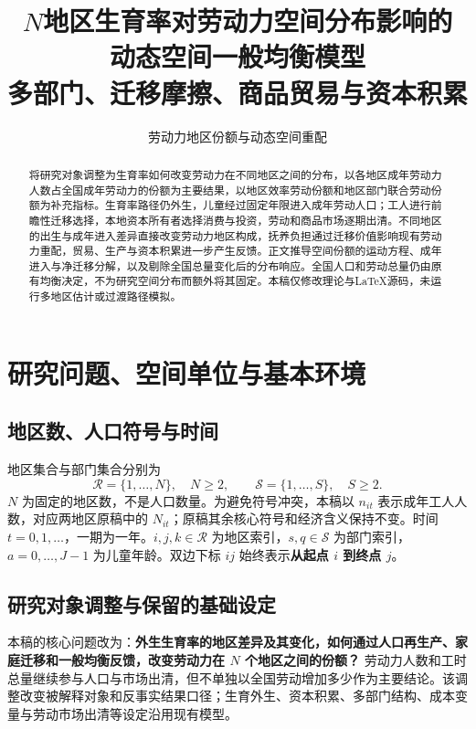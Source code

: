 \documentclass[UTF8,a4paper,zihao=-4,fontset=windows]{ctexart}
\title{$N$地区生育率对劳动力空间分布影响的\\动态空间一般均衡模型\\[0.4em]
\large 多部门、迁移摩擦、商品贸易与资本积累}
\author{劳动力地区份额与动态空间重配}
\date{}
\numberwithin{equation}{section}
\begin{document}
\maketitle
\begin{abstract}
将研究对象调整为生育率如何改变劳动力在不同地区之间的分布，以各地区成年劳动力人数占全国成年劳动力的份额为主要结果，以地区效率劳动份额和地区部门联合劳动份额为补充指标。生育率路径仍外生，儿童经过固定年限进入成年劳动人口；工人进行前瞻性迁移选择，本地资本所有者选择消费与投资，劳动和商品市场逐期出清。不同地区的出生与成年进入差异直接改变劳动力地区构成，抚养负担通过迁移价值影响现有劳动力重配，贸易、生产与资本积累进一步产生反馈。正文推导空间份额的运动方程、成年进入与净迁移分解，以及剔除全国总量变化后的分布响应。全国人口和劳动总量仍由原有均衡决定，不为研究空间分布而额外将其固定。本稿仅修改理论与LaTeX源码，未运行多地区估计或过渡路径模拟。
\end{abstract}
\newpage
\tableofcontents
\newpage

\section{研究问题、空间单位与基本环境}
\label{sec:lg-environment}

\subsection{地区数、人口符号与时间}
地区集合与部门集合分别为
\begin{equation}
 \mathcal R=\{1,\ldots,N\},\quad N\geq2,\qquad
 \mathcal S=\{1,\ldots,S\},\quad S\geq2.
 \label{eq:lg-sets}
\end{equation}
$N$ 为固定的地区数，不是人口数量。为避免符号冲突，本稿以 $n_{it}$ 表示成年工人人数，对应两地区原稿中的 $N_{it}$；原稿其余核心符号和经济含义保持不变。时间 $t=0,1,\ldots$，一期为一年。$i,j,k\in\mathcal R$ 为地区索引，$s,q\in\mathcal S$ 为部门索引，$a=0,\ldots,J-1$ 为儿童年龄。双边下标 $ij$ 始终表示\textbf{从起点 $i$ 到终点 $j$}。

\subsection{研究对象调整与保留的基础设定}
本稿的核心问题改为：\textbf{外生生育率的地区差异及其变化，如何通过人口再生产、家庭迁移和一般均衡反馈，改变劳动力在 $N$ 个地区之间的份额？} 劳动力人数和工时总量继续参与人口与市场出清，但不单独以全国劳动增加多少作为主要结论。该调整改变被解释对象和反事实结果口径；生育外生、资本积累、多部门结构、成本变量与劳动市场出清等设定沿用现有模型。
\end{document}
